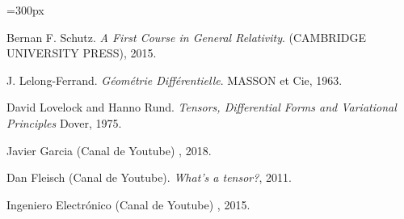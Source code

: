 \documentclass[a0,portrait]{a0poster} %
\begin{document}
\vspace{2cm} 
\columnsep=300px
\begin{multicols}{2}
\small{
\begin{thebibliography}{6}
Bernan F. Schutz.
\textit{A First Course in General Relativity}.
(CAMBRIDGE UNIVERSITY PRESS), 2015.

J. Lelong-Ferrand.
\textit{Géométrie Différentielle}.
MASSON et Cie, 1963.

David Lovelock and Hanno Rund.
\textit{Tensors, Differential Forms and Variational Principles}
Dover, 1975.

Javier Garcia (Canal de Youtube)
, 2018.

Dan Fleisch (Canal de Youtube).
\textit{What's a tensor?}, 2011.

Ingeniero Electrónico (Canal de Youtube)
, 2015.
\end{thebibliography}}
\end{multicols}
\end{document}
